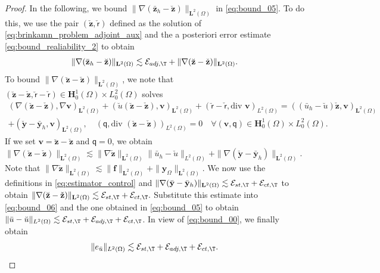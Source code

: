 \documentclass[final]{siamart0216}
\begin{document}
\begin{proof}
In the following, we bound $\|\nabla(\bar{\mathbf{z}}_{h}-\breve{\mathbf{z}})\|_{\mathbf{L}^2(\Omega)}$ in \eqref{eq:bound_05}. To do this, we use the pair $(\check{\mathbf{z}},\check{\mathsf{r}})$ defined as the solution of \eqref{eq:brinkamn_problem_adjoint_aux} and the a posteriori error estimate \eqref{eq:bound_realiability_2} to obtain 
\begin{align}\label{eq:bound_06}
\|\nabla(\bar{\mathbf{z}}_{h}-\breve{\mathbf{z}})\|_{\mathbf{L}^2(\Omega)}\lesssim \mathcal{E}_{adj,\T}+\|\nabla(\breve{\mathbf{z}}-\check{\mathbf{z}})\|_{\mathbf{L}^2(\Omega)}.
\end{align}
To bound $\|\nabla(\breve{\mathbf{z}}-\check{\mathbf{z}})\|_{\mathbf{L}^2(\Omega)}$, we note that $(\breve{\mathbf{z}}-\check{\mathbf{z}},\breve{\mathsf{r}}-\check{\mathsf{r}})\in\mathbf{H}_0^1(\Omega)\times L_0^2(\Omega)$ solves
\begin{multline*}
(\nabla (\breve{\mathbf{z}}-\check{\mathbf{z}}),\nabla \mathbf{v})_{\mathbf{L}^2(\Omega)}+( \breve{u}(\breve{\mathbf{z}}-\check{\mathbf{z}}), \mathbf{v})_{\mathbf{L}^2(\Omega)}+(\breve{\mathsf{r}}-\check{\mathsf{r}},\text{div }\mathbf{v})_{L^2(\Omega)} = ((\bar{u}_{h}-\breve{u})\check{\mathbf{z}},\mathbf{v})_{\mathbf{L}^2(\Omega)}\\+(\breve{\mathbf{y}}-\bar{\mathbf{y}}_{h},\mathbf{v})_{\mathbf{L}^2(\Omega)},\quad
(\mathsf{q},\text{div }(\breve{\mathbf{z}}-\check{\mathbf{z}}))_{L^2(\Omega)}  =  0 \quad\forall (\mathbf{v},\mathsf{q})\in  \mathbf{H}_0^1(\Omega)\times L_0^2(\Omega). 
\end{multline*}
If we set $\mathbf{v} = \breve{\mathbf{z}}-\check{\mathbf{z}}$ and $\mathsf{q}=0$, we obtain
$
\|\nabla(\breve{\mathbf{z}}-\check{\mathbf{z}})\|_{\mathbf{L}^2(\Omega)}\lesssim \|\nabla\check{\mathbf{z}}\|_{\mathbf{L}^2(\Omega)}\|\bar{u}_{h}-\breve{u}\|_{L^2(\Omega)}+\|\nabla(\breve{\mathbf{y}}-\bar{\mathbf{y}}_{h})\|_{\mathbf{L}^2(\Omega)}.
$
Note that $\|\nabla \check{\mathbf{z}}\|_{\mathbf{L}^2(\Omega)} \lesssim \|\mathbf{f}\|_{\mathbf{L}^2(\Omega)}+\|\mathbf{y}_{\Omega}\|_{\mathbf{L}^2(\Omega)}$. We now use the definitions in \eqref{eq:estimator_control} and $\|\nabla (\breve{\mathbf{y}}-\bar{\mathbf{y}}_{h})\|_{\mathbf{L}^2(\Omega)}\lesssim \mathcal{E}_{st,\T}+\mathcal{E}_{ct,\T}$ to obtain 
$
\|\nabla(\breve{\mathbf{z}}-\check{\mathbf{z}})\|_{\mathbf{L}^2(\Omega)}\lesssim \mathcal{E}_{st,\T}+\mathcal{E}_{ct,\T}.
$
Substitute this estimate into \eqref{eq:bound_06} and the one obtained in \eqref{eq:bound_05} to obtain $\|\bar{u}-\breve{u}\|_{L^2(\Omega)}\lesssim \mathcal{E}_{st,\T}+\mathcal{E}_{adj,\T}+\mathcal{E}_{ct,\T}$. In view of \eqref{eq:bound_00}, we finally obtain
\begin{align}\label{eq:bound_10}
\|e_{\bar{u}}\|_{L^2(\Omega)}\lesssim \mathcal{E}_{st,\T}+\mathcal{E}_{adj,\T}+\mathcal{E}_{ct,\T}.
\end{align}


\end{proof}
\end{document}
